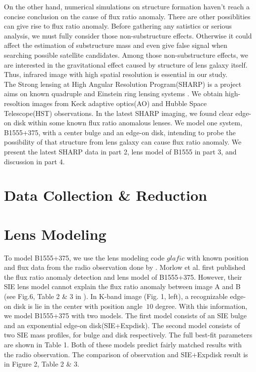 \documentclass[manuscript]{emulateapj}
\begin{document}
On the other hand, numerical simulations on structure formation haven't reach a concise conclusion on the cause of flux ratio anomaly. There are other possiblities can give rise to flux ratio anomaly. Before gathering any satistics or serious analysis, we must fully consider those non-substructure effects. Otherwise it could affect the estimation of substructure mass and even give false signal when searching possible satellite candidates. Among those non-substructure effects, we are interested in the gravitational effect caused by structure of lens galaxy itself. Thus, infrared image with high spatial resolution is essential in our study.\\
The Strong lensing at High Angular Resolution Program(SHARP) is a project aims on known quadruple and Einstein ring lensing systems \citep{SHARP12}. We obtain high-resoltion images from Keck adaptive optics(AO) and Hubble Space Telescope(HST) observations. In the latest SHARP imaging, we found clear edge-on disk within some known flux ratio anomalous lenses. We model one system, B1555+375, with a center bulge and an edge-on disk, intending to probe the possibility of that structure from lens galaxy can cause flux ratio anomaly. We present the latest SHARP data in part 2, lens model of B1555 in part 3, and discussion in part 4. 

\section{Data Collection \& Reduction}

\section{Lens Modeling}
To model B1555+375, we use the lens modeling code $glafic$ \citep{Oguri} with known position and flux data from the radio observation done by \citet{Marlow}. Morlow et al. first published the flux ratio anomaly detection and lens model of B1555+375. However, their SIE lens model cannot explain the flux ratio anomaly between image A and B (see Fig.6, Table 2 \& 3 in \citet{Marlow}). In K-band image (Fig. 1, left), a recognizable edge-on disk is lie in the center with position angle $~10$ degree. With this information, we model B1555+375 with two models. The first model consists of an SIE bulge and an exponential edge-on disk(SIE+Expdisk). The second model consists of two SIE mass profiles, for bulge and disk respectively. The full best-fit parameters are shown in Table 1. Both of these models predict fairly matched results with the radio observation. The comparison of observation and SIE+Expdisk result is in Figure 2, Table 2 \& 3.\\
\end{document}
